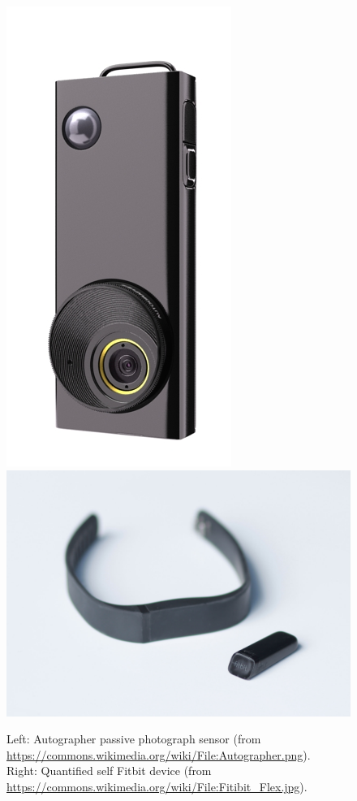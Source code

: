 \documentclass[12pt,a4paper]{article}
\begin{document}
\begin{figure}[h]
\centering
\includegraphics[scale=0.2]{images/Autographer.png} \hspace{25pt}
\includegraphics[scale=0.054]{images/Fitibit_Flex.jpg}
\caption{Left: Autographer passive photograph sensor (from \url{https://commons.wikimedia.org/wiki/File:Autographer.png}).\\ Right: Quantified self Fitbit device (from \url{https://commons.wikimedia.org/wiki/File:Fitibit_Flex.jpg}).} \label{fig:test}
\end{figure}
\end{document}
